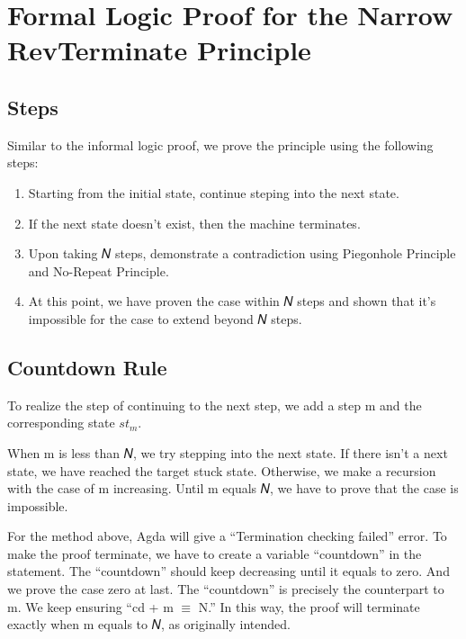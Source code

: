 \section{Formal Logic Proof for the Narrow RevTerminate Principle}

\subsection{ Steps }


Similar to the informal logic proof, we prove the principle using the following steps:
\begin{enumerate}[1.]
    \item Starting from the initial state, continue steping into the next state.
    \item If the next state doesn't exist, then the machine terminates.
    \item Upon taking 𝑁 steps, demonstrate a contradiction using Piegonhole Principle and No-Repeat Principle.
    \item At this point, we have proven the case within 𝑁 steps and shown that it's impossible for the case to extend beyond 𝑁 steps.
\end{enumerate}

\subsection{ Countdown Rule }
To realize the step of continuing to the next step, we add a step m and the corresponding state $st_{m}$.


When m is less than 𝑁, we try stepping into the next state.  
If there isn't a next state, we have reached the target stuck state.  
Otherwise, we make a recursion with the case of m increasing.
Until m equals 𝑁, we have to prove that the case is impossible.


For the method above, Agda will give a ``Termination checking failed'' error.
To make the proof terminate, we have to create a variable ``countdown'' in the statement.  
The ``countdown'' should keep decreasing until it equals to zero.  And we prove the case zero at last.
The ``countdown'' is precisely the counterpart to m.  
We keep ensuring ``cd + m $\equiv$ N.''  
In this way, the proof will terminate exactly when m equals to 𝑁, as originally intended.

